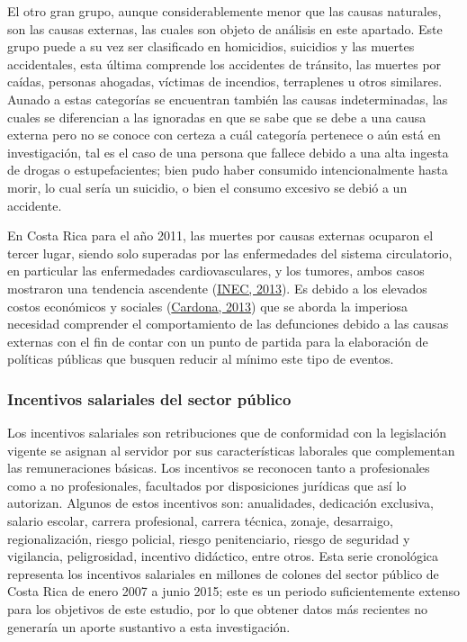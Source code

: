 \documentclass[
]{article}
\begin{document}
El otro gran grupo, aunque considerablemente menor que las causas
naturales, son las causas externas, las cuales son objeto de análisis en
este apartado. Este grupo puede a su vez ser clasificado en homicidios,
suicidios y las muertes accidentales, esta última comprende los
accidentes de tránsito, las muertes por caídas, personas ahogadas,
víctimas de incendios, terraplenes u otros similares. Aunado a estas
categorías se encuentran también las causas indeterminadas, las cuales
se diferencian a las ignoradas en que se sabe que se debe a una causa
externa pero no se conoce con certeza a cuál categoría pertenece o aún
está en investigación, tal es el caso de una persona que fallece debido
a una alta ingesta de drogas o estupefacientes; bien pudo haber
consumido intencionalmente hasta morir, lo cual sería un suicidio, o
bien el consumo excesivo se debió a un accidente.

En Costa Rica para el año 2011, las muertes por causas externas ocuparon
el tercer lugar, siendo solo superadas por las enfermedades del sistema
circulatorio, en particular las enfermedades cardiovasculares, y los
tumores, ambos casos mostraron una tendencia ascendente
(\protect\hyperlink{ref-nacion}{INEC, 2013}). Es debido a los elevados
costos económicos y sociales
(\protect\hyperlink{ref-ccpexternas}{Cardona, 2013}) que se aborda la
imperiosa necesidad comprender el comportamiento de las defunciones
debido a las causas externas con el fin de contar con un punto de
partida para la elaboración de políticas públicas que busquen reducir al
mínimo este tipo de eventos.

\subsubsection{Incentivos salariales del sector público}

Los incentivos salariales son retribuciones que de conformidad con la
legislación vigente se asignan al servidor por sus características
laborales que complementan las remuneraciones básicas. Los incentivos se
reconocen tanto a profesionales como a no profesionales, facultados por
disposiciones jurídicas que así lo autorizan. Algunos de estos
incentivos son: anualidades, dedicación exclusiva, salario escolar,
carrera profesional, carrera técnica, zonaje, desarraigo,
regionalización, riesgo policial, riesgo penitenciario, riesgo de
seguridad y vigilancia, peligrosidad, incentivo didáctico, entre otros.
Esta serie cronológica representa los incentivos salariales en millones
de colones del sector público de Costa Rica de enero 2007 a junio 2015;
este es un periodo suficientemente extenso para los objetivos de este
estudio, por lo que obtener datos más recientes no generaría un aporte
sustantivo a esta investigación.
\end{document}
